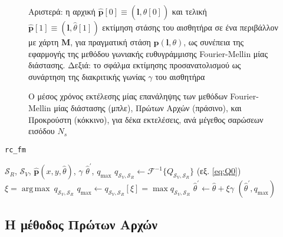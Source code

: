 \begin{figure}[!h]\centering
  \vspace{0.5cm}
  
  \vspace{0.5cm}
  \caption{\small Αριστερά: η αρχική
           $\hat{\bm{p}}[0] \equiv (\bm{l},\hat{\theta}[0])$ και τελική
           $\hat{\bm{p}}[1] \equiv (\bm{l},\hat{\theta}[1])$ εκτίμηση στάσης του
           αισθητήρα σε ένα περιβάλλον με χάρτη $\bm{M}$, για πραγματική στάση
           $\bm{p}(\bm{l},\theta)$, ως συνέπεια της εφαρμογής της μεθόδου
           γωνιακής ευθυγράμμισης Fourier-Mellin μίας διάστασης. Δεξιά: το
           σφάλμα εκτίμησης προσανατολισμού ως συνάρτηση της διακριτικής γωνίας
           $\gamma$ του αισθητήρα}
  \label{fig:02_04_02:rc_fm}
\end{figure}

\begin{figure}[!h]\centering
  
  \caption{\small Ο μέσος χρόνος εκτέλεσης μίας επανάληψης των μεθόδων
           Fourier-Mellin μίας διάστασης (μπλε), Πρώτων Αρχών (πράσινο), και
           Προκρούστη (κόκκινο), για δέκα εκτελέσεις, ανά μέγεθος
           σαρώσεων εισόδου $N_s$}
  \label{fig:02_04_02:exec_times_all_rotations_default}
\end{figure}

\begin{algorithm}[!h]
  \caption{\texttt{rc\_fm}}
  \label{alg:algorithm_fmrc}
  \begin{spacing}{1.3}
  \begin{algorithmic}[1]
    \REQUIRE $\mathcal{S}_R$, $\mathcal{S}_V$, $\hat{\bm{p}}(x, y, \hat{\theta})$, $\gamma$
    \ENSURE $\hat{\theta}^\prime$, $q_{\max}$
    \STATE $q_{\mathcal{S}_V, \mathcal{S}_R} \leftarrow \mathcal{F}^{-1}\{Q_{\mathcal{S}_V, \mathcal{S}_R}\}$ (εξ. \ref{eq:Q0})
    \STATE $\xi = \operatorname*{arg\,max} \ q_{\mathcal{S}_V, \mathcal{S}_R}$
    \STATE $q_{\max} \leftarrow q_{\mathcal{S}_V, \mathcal{S}_R}[\xi] = \max q_{\mathcal{S}_V, \mathcal{S}_R}$
    \STATE $\hat{\theta}^\prime \leftarrow \hat{\theta} + \xi \gamma$
    \RETURN $(\hat{\theta}^\prime, q_{\max})$
  \end{algorithmic}
  \end{spacing}
\end{algorithm}


\subsection{Η μέθοδος Πρώτων Αρχών}
\label{subsection:02_04_02:02}

